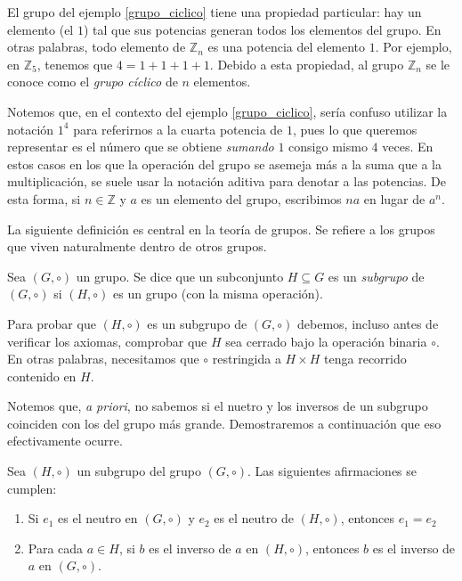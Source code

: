 El grupo del ejemplo \ref{grupo_ciclico} tiene una propiedad particular: hay un elemento (el $1$) tal que sus potencias generan todos los elementos del grupo. En otras palabras, todo elemento de $\mathbb{Z}_n$ es una potencia del elemento $1$. Por ejemplo, en $\mathbb{Z}_5$, tenemos que $4 = 1 + 1 + 1 + 1$. Debido a esta propiedad, al grupo $\mathbb{Z}_n$ se le conoce como el \emph{grupo cíclico} de $n$ elementos. 

\begin{remark} Notemos que, en el contexto del ejemplo \ref{grupo_ciclico}, sería confuso utilizar la notación $1^4$ para referirnos a la cuarta potencia de $1$, pues lo que queremos representar es el número que se obtiene \textit{sumando} $1$ consigo mismo $4$ veces. En estos casos en los que la operación del grupo se asemeja más a la suma que a la multiplicación, se suele usar la notación aditiva para denotar a las potencias. De esta forma, si $n \in \mathbb{Z}$ y $a$ es un elemento del grupo, escribimos $n a$ en lugar de $a^n$.
\end{remark}


La siguiente definición es central en la teoría de grupos. Se refiere a los grupos que viven naturalmente dentro de otros grupos.

\begin{definition}
Sea $(G,\circ)$ un grupo. Se dice que un subconjunto $H \subseteq G$ es un \emph{subgrupo} de $(G,\circ)$ si $(H, \circ)$ es un grupo (con la misma operación).
\end{definition}

Para probar que $(H, \circ)$ es un subgrupo de $(G, \circ)$ debemos, incluso antes de verificar los axiomas, comprobar que $H$ sea cerrado bajo la operación binaria $\circ$. En otras palabras, necesitamos que $\circ$ restringida a $H \times H$ tenga recorrido contenido en $H$. 


Notemos que, \textit{a priori}, no sabemos si el nuetro y los inversos de un subgrupo coinciden con los del grupo más grande. Demostraremos a continuación que eso efectivamente ocurre.


\begin{proposition}
Sea $(H, \circ)$ un subgrupo del grupo $(G, \circ)$. Las siguientes afirmaciones se cumplen:
	\begin{enumerate}
		\item Si $e_1$ es el neutro en $(G, \circ)$ y $e_2$ es el neutro de $(H, \circ)$, entonces $e_1 = e_2$

		\item Para cada $a \in H$, si $b$ es el inverso de $a$ en $(H, \circ)$, entonces $b$ es el inverso de $a$ en $(G, \circ)$.
	\end{enumerate}
\end{proposition}

